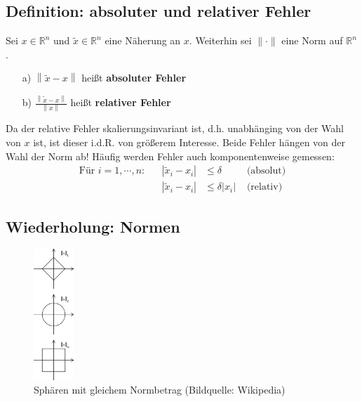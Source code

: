 \documentclass[ngerman,fontsize=11pt, paper=a4, parskip=half, titlepage=true, toc=bib]{scrbook}
\newcommand{\R}{\mathds{R}}
\newcommand{\nn}[1]{\left\| #1 \right\|}
\begin{document}
\subsection{Definition: absoluter und relativer Fehler} \label{3.2.2} 
Sei $x\in\R^n$ und $\widetilde{x} \in \R^n$ eine Näherung an $x$. Weiterhin sei $\|\cdot\|$ eine Norm auf $\R^n$.
\begin{itemize}
	\item[a)] $\nn{\widetilde{x} - x}$ heißt \textbf{absoluter Fehler} 
	\item[b)] $\frac{\nn{\widetilde{x} - x}}{\nn{x}}$ heißt \textbf{relativer Fehler}
\end{itemize}
Da der relative Fehler skalierungsinvariant ist, d.h. unabhänging von der  Wahl von $x$ ist, ist dieser i.d.R. von größerem Interesse.
Beide Fehler hängen von der Wahl der Norm ab!
Häufig werden Fehler auch komponentenweise gemessen:
\begin{align*}
	\text{Für } i=1,\cdots , n : && |\widetilde{x}_i - x_i | & \leq \delta & \text{ (absolut)} \\
											 && |\widetilde{x}_i - x_i | &\leq \delta |x_i| & \text{ (relativ)}
\end{align*}

\subsection{Wiederholung: Normen} \label{3.2.3}
\begin{figure}
	\centering
	\includegraphics[width=1.5cm]{images/normen.png}
	\caption{Sphären mit gleichem Normbetrag (Bildquelle: Wikipedia)}
\end{figure}
\end{document}
